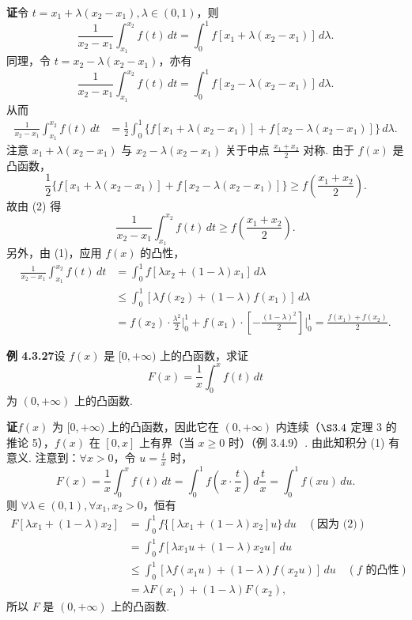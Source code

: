\documentclass[UTF8,12pt,a4paper,fontset=fandol]{ctexart}
\begin{document}
\noindent\textbf{证}\quad 令 $t=x_1+\lambda(x_2-x_1),\lambda\in(0,1)$，则
\[
\frac1{x_2-x_1}\int_{x_1}^{x_2}f(t)\,dt
=\int_0^1 f[x_1+\lambda(x_2-x_1)]\,d\lambda.
\tag{1}
\]
同理，令 $t=x_2-\lambda(x_2-x_1)$，亦有
\[
\frac1{x_2-x_1}\int_{x_1}^{x_2}f(t)\,dt
=\int_0^1 f[x_2-\lambda(x_2-x_1)]\,d\lambda.
\]
从而
\[
\begin{aligned}
\frac1{x_2-x_1}\int_{x_1}^{x_2}f(t)\,dt
&=\frac12\int_0^1\{f[x_1+\lambda(x_2-x_1)]
+f[x_2-\lambda(x_2-x_1)]\}\,d\lambda.
\end{aligned}
\tag{2}
\]
注意 $x_1+\lambda(x_2-x_1)$ 与 $x_2-\lambda(x_2-x_1)$ 关于中点 $\frac{x_1+x_2}{2}$ 对称. 由于 $f(x)$ 是凸函数，
\[
\frac12\{f[x_1+\lambda(x_2-x_1)]
+f[x_2-\lambda(x_2-x_1)]\}
\ge f\left(\frac{x_1+x_2}{2}\right).
\]
故由 (2) 得
\[
\frac1{x_2-x_1}\int_{x_1}^{x_2}f(t)\,dt
\ge f\left(\frac{x_1+x_2}{2}\right).
\]
另外，由 (1)，应用 $f(x)$ 的凸性，
\[
\begin{aligned}
\frac1{x_2-x_1}\int_{x_1}^{x_2}f(t)\,dt
&=\int_0^1 f[\lambda x_2+(1-\lambda)x_1]\,d\lambda\\
&\le\int_0^1[\lambda f(x_2)+(1-\lambda)f(x_1)]\,d\lambda\\
&=f(x_2)\cdot\frac{\lambda^2}{2}\bigg|_0^1
+f(x_1)\cdot\left[-\frac{(1-\lambda)^2}{2}\right]\bigg|_0^1
=\frac{f(x_1)+f(x_2)}2.
\end{aligned}
\]

\noindent\textbf{例 4.3.27}\quad 设 $f(x)$ 是 $[0,+\infty)$ 上的凸函数，求证
\[
F(x)=\frac1x\int_0^x f(t)\,dt
\tag{1}
\]
为 $(0,+\infty)$ 上的凸函数.

\noindent\textbf{证}\quad $f(x)$ 为 $[0,+\infty)$ 上的凸函数，因此它在 $(0,+\infty)$ 内连续（$\S3.4$ 定理 3 的推论 5），$f(x)$ 在 $[0,x]$ 上有界（当 $x\ge0$ 时）（例 3.4.9）. 由此知积分 (1) 有意义. 注意到：$\forall x>0$，令 $u=\frac{t}{x}$ 时，
\[
F(x)=\frac1x\int_0^x f(t)\,dt
=\int_0^1 f\left(x\cdot\frac{t}{x}\right)\,d\frac{t}{x}
=\int_0^1 f(xu)\,du.
\tag{2}
\]
则 $\forall\lambda\in(0,1),\forall x_1,x_2>0$，恒有
\[
\begin{aligned}
F[\lambda x_1+(1-\lambda)x_2]
&=\int_0^1 f\{[\lambda x_1+(1-\lambda)x_2]u\}\,du\quad(\text{因为 (2)})\\
&=\int_0^1 f[\lambda x_1u+(1-\lambda)x_2u]\,du\\
&\le\int_0^1[\lambda f(x_1u)+(1-\lambda)f(x_2u)]\,du\quad(f\text{ 的凸性})\\
&=\lambda F(x_1)+(1-\lambda)F(x_2),
\end{aligned}
\]
所以 $F$ 是 $(0,+\infty)$ 上的凸函数.
\end{document}
